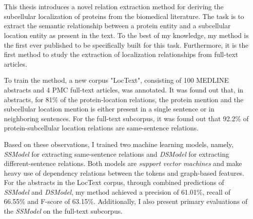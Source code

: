 \chapter{\abstractname}

This thesis introduces a novel relation extraction method for deriving the subcellular localization of proteins from the biomedical literature. The task is to extract the semantic relationship between a protein entity and a subcellular location entity as present in the text. To the best of my knowledge, my method is the first ever published to be specifically built for this task. Furthermore, it is the first method to study the extraction of localization relationships from full-text articles.

To train the method, a new corpus "LocText", consisting of 100 MEDLINE abstracts and 4 PMC full-text articles, was annotated. It was found out that, in abstracts, for 81\% of the protein-location relations, the protein mention and the subcellular location mention is either present in a single sentence or in neighboring sentences. For the full-text subcorpus, it was found out that 92.2\% of protein-subcellular location relations are same-sentence relations.

Based on these observations, I trained two machine learning models, namely, \textit{SSModel} for extracting same-sentence relations and \textit{DSModel} for extracting different-sentence relations. Both models are \textit{support vector machines} and make heavy use of dependency relations between the tokens and graph-based features. For the abstracts in the LocText corpus, through combined predictions of \textit{SSModel} and \textit{DSModel}, my method achieved a precision of 61.01\%, recall of 66.55\% and F-score of 63.15\%. Additionally, I also present primary evaluations of the \textit{SSModel} on the full-text subcorpus.